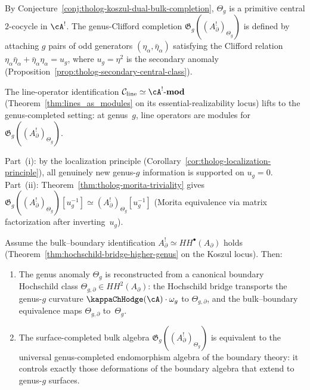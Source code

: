 \begin{remark}
By Conjecture~\ref{conj:tholog-koszul-dual-bulk-completion},
\(\Theta_g\) is a primitive central \(2\)-cocycle in \(\cA^!\).
The genus-Clifford completion
\(\mathfrak{G}_g((A_\partial^!)_{\Theta_g})\)
is defined by attaching \(g\) pairs of odd generators
\((\eta_\alpha, \bar\eta_\alpha)\) satisfying the Clifford
relation \(\eta_\alpha \bar\eta_\alpha +
\bar\eta_\alpha \eta_\alpha = u_g\), where
\(u_g = \eta^2\) is the secondary anomaly
(Proposition~\ref{prop:tholog-secondary-central-class}).

The line-operator identification
\(\mathcal{C}_{\mathrm{line}} \simeq \cA^!\text{-}\mathbf{mod}\)
(Theorem~\ref{thm:lines_as_modules} on its
essential-realizability locus) lifts to the genus-completed setting:
at genus~\(g\), line operators are modules for
\(\mathfrak{G}_g((A_\partial^!)_{\Theta_g})\).

Part~(i): by the localization principle
(Corollary~\ref{cor:tholog-localization-principle}), all genuinely
new genus-\(g\) information is supported on \(u_g = 0\).
Part~(ii): Theorem~\ref{thm:tholog-morita-triviality} gives
\(\mathfrak{G}_g((A_\partial^!)_{\Theta_g})[u_g^{-1}] \simeq
(A_\partial^!)_{\Theta_g}[u_g^{-1}]\) (Morita equivalence via
matrix factorization after inverting~\(u_g\)).
\end{remark}

\begin{conjecture}
Assume the bulk--boundary identification
\(A_{\partial}^{!} \simeq HH^{\bullet}(A_{\partial})\)
holds (Theorem~\textup{\ref{thm:hochschild-bridge-higher-genus}}
on the Koszul locus). Then:
\begin{enumerate}[label=\textup{(\roman*)}]
\item The genus anomaly \(\Theta_{g}\) is reconstructed from a
 canonical boundary Hochschild class
 \(\Theta_{g,\partial} \in HH^{2}(A_{\partial})\):
 the Hochschild bridge transports the genus-\(g\) curvature
 \(\kappaChHodge(\cA) \cdot \omega_g\) to
 \(\Theta_{g,\partial}\), and the bulk--boundary equivalence
 maps \(\Theta_{g,\partial}\) to~\(\Theta_g\).
\item The surface-completed bulk algebra
 \(\mathfrak{G}_g((A_\partial^!)_{\Theta_g})\) is equivalent to
 the universal genus-completed endomorphism algebra of the boundary
 theory: it controls exactly those deformations of the boundary
 algebra that extend to genus-\(g\) surfaces.
\end{enumerate}
\end{conjecture}

